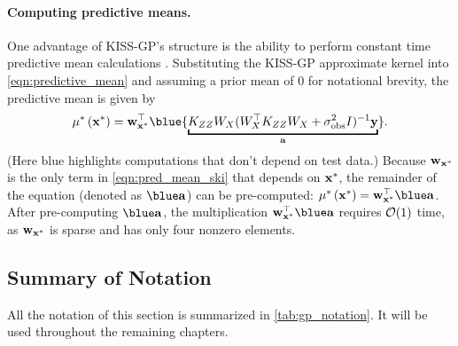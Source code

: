 \paragraph{Computing predictive means.}
One advantage of KISS-GP's structure is the ability to perform constant time predictive mean calculations \cite{wilson2015thoughts}.
Substituting the KISS-GP approximate kernel into \cref{eqn:predictive_mean} and assuming a prior mean of 0 for notational brevity, the predictive mean is given by
\begin{equation}
  \meantest{\bxtest} = \bw_{\bxtest}^\top {\blue{\underbracket{\bK_{\bZ\bZ} \bW_{\bX}(\bW_{\bX}^{\top}\bK_{\bZ\bZ}\bW_{\bX} + \sigma_\text{obs}^{2} \bI)^{-1} \by}_{\ba}}}.
  \label{eqn:pred_mean_ski}
\end{equation}
(Here {\color{blue} blue} highlights computations that don't depend on test data.)
Because $\mathbf{w}_{\mathbf{x}^{*}}$ is the only term in \eqref{eqn:pred_mean_ski} that depends on $\mathbf{x}^{*}$, the remainder of the equation (denoted as $\blue\ba$) can be pre-computed: $\meantest{\bxtest} = \bw_{\bxtest}^\top \blue \ba$.
After pre-computing $\blue \ba$, the multiplication $\bw_{\bx^{*}}^\top \blue \ba$ requires $\bigo{1}$ time, as $\mathbf{w}_{\mathbf{x}^{*}}$ is sparse and has only four nonzero elements.

\subsection{Summary of Notation}
All the notation of this section is summarized in \cref{tab:gp_notation}.
It will be used throughout the remaining chapters.

